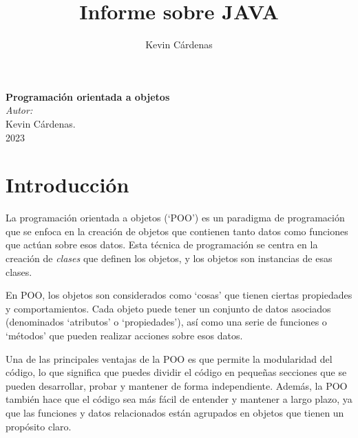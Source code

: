 \documentclass[executivepaper]{article}
\title{Informe sobre JAVA}
\author{Kevin Cárdenas}
\begin{document}
\begin{titlepage}
    \begin{center}
        {\Huge \textbf{Programación orientada a objetos}}
        \\[18cm]

        \large\emph{Autor:}\\
        Kevin Cárdenas.
        \\[1cm]
        {\large 2023}
    \end{center}
\end{titlepage}

\newpage
\tableofcontents
\newpage
\section{Introducción}
La programación orientada a objetos (\enquote*{POO}) es un paradigma de programación que se enfoca en la creación de objetos que contienen tanto datos como funciones que actúan sobre esos datos. Esta técnica de programación se centra en la creación de \textit{clases} que definen los objetos, y los objetos son instancias de esas clases.

En POO, los objetos son considerados como \enquote*{cosas} que tienen ciertas propiedades y comportamientos. Cada objeto puede tener un conjunto de datos asociados (denominados \enquote*{atributos} o \enquote*{propiedades}), así como una serie de funciones o \enquote*{métodos} que pueden realizar acciones sobre esos datos.

Una de las principales ventajas de la POO es que permite la modularidad del código, lo que significa que puedes dividir el código en pequeñas secciones que se pueden desarrollar, probar y mantener de forma independiente. Además, la POO también hace que el código sea más fácil de entender y mantener a largo plazo, ya que las funciones y datos relacionados están agrupados en objetos que tienen un propósito claro.
\end{document}
